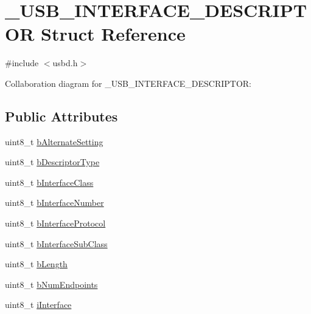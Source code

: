 \hypertarget{struct__USB__INTERFACE__DESCRIPTOR}{}\section{\+\_\+\+U\+S\+B\+\_\+\+I\+N\+T\+E\+R\+F\+A\+C\+E\+\_\+\+D\+E\+S\+C\+R\+I\+P\+T\+OR Struct Reference}
\label{struct__USB__INTERFACE__DESCRIPTOR}


{\ttfamily \#include $<$usbd.\+h$>$}



Collaboration diagram for \+\_\+\+U\+S\+B\+\_\+\+I\+N\+T\+E\+R\+F\+A\+C\+E\+\_\+\+D\+E\+S\+C\+R\+I\+P\+T\+OR\+:
\subsection*{Public Attributes}
\begin{DoxyCompactItemize}
\item 
uint8\+\_\+t \hyperlink{struct__USB__INTERFACE__DESCRIPTOR_aa596036a18b317c3dbeb9ea417938a43}{b\+Alternate\+Setting}
\item 
uint8\+\_\+t \hyperlink{struct__USB__INTERFACE__DESCRIPTOR_a37b3f11033507a50c072cefb0000a8f4}{b\+Descriptor\+Type}
\item 
uint8\+\_\+t \hyperlink{struct__USB__INTERFACE__DESCRIPTOR_a21d6fc8a0a868dc4061084f9d0f62684}{b\+Interface\+Class}
\item 
uint8\+\_\+t \hyperlink{struct__USB__INTERFACE__DESCRIPTOR_a1cd05be188c8776aaa33029e0e7e8c32}{b\+Interface\+Number}
\item 
uint8\+\_\+t \hyperlink{struct__USB__INTERFACE__DESCRIPTOR_a12f09e3be7c323bbd776f75af515ec7f}{b\+Interface\+Protocol}
\item 
uint8\+\_\+t \hyperlink{struct__USB__INTERFACE__DESCRIPTOR_af88328ec7f751751f3397df1c4c032b2}{b\+Interface\+Sub\+Class}
\item 
uint8\+\_\+t \hyperlink{struct__USB__INTERFACE__DESCRIPTOR_a16fbd548f47d86ea2c045da5a091ed79}{b\+Length}
\item 
uint8\+\_\+t \hyperlink{struct__USB__INTERFACE__DESCRIPTOR_a9972081626557a77abd11258cc75684b}{b\+Num\+Endpoints}
\item 
uint8\+\_\+t \hyperlink{struct__USB__INTERFACE__DESCRIPTOR_a69b79c8ff54fe5c4ce9e0517923332a5}{i\+Interface}
\end{DoxyCompactItemize}


